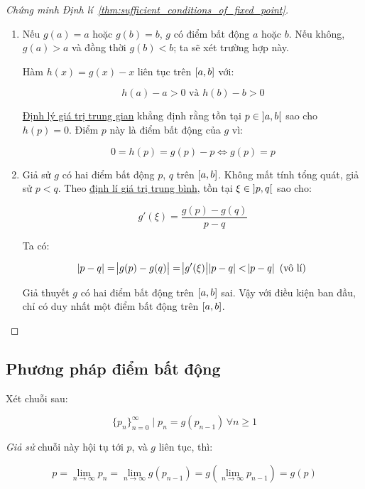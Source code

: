 \documentclass[../../Lectures]{subfiles}
\begin{document}
\begin{proof}[Chứng minh Định lí~\ref{thm:sufficient_conditions_of_fixed_point}]
\phantom\\
\begin{enumerate}
    \item Nếu \(g(a) = a\) hoặc \(g(b) = b\), \(g\) có điểm bất động \(a\) hoặc
        \(b\). Nếu không, \(g(a) > a\) và đồng thời \(g(b) < b\); ta sẽ xét
        trường hợp này.

        Hàm \(h(x) = g(x) - x\) liên tục trên \(\interval{a}{b}\) với:

        \[h(a) - a > 0 \text{ và } h(b) - b > 0\]

        \hyperref[thm:intermediate_value_theorem]{Định lý giá trị trung gian}
        khẳng định rằng tồn tại \(p \in \interval[open]{a}{b}\) sao cho \(h(p) =
        0\). Điểm \(p\) này là điểm bất động của \(g\) vì:

        \[0 = h(p) = g(p) - p \iff g(p) = p\]

    \item Giả sử \(g\) có hai điểm bất động \(p\), \(q\) trên
        \(\interval{a}{b}\). Không mất tính tổng quát, giả sử \(p < q\). Theo
        \hyperref[thm:mean_value_theorem]{định lí giá trị trung bình}, tồn tại
        \(\xi \in \interval[open]{p}{q}\) sao cho:

        \[g'(\xi) = \frac{g(p) - g(q)}{p - q}\]

        Ta có:

        \[\abs{p - q} = \abs{g(p) - g(q)} = \abs{g'(\xi)} \abs{p - q} < \abs{p - q} \text{ (vô lí)}\]

        Giả thuyết \(g\) có hai điểm bất động trên \(\interval{a}{b}\) sai. Vậy
        với điều kiện ban đầu, chỉ có duy nhất một điểm bất động trên
        \(\interval{a}{b}\).
\end{enumerate}
\end{proof}

\subsection{Phương pháp điểm bất động}

Xét chuỗi sau:

\[\{p_n\}_{n=0}^\infty \mid p_n = g(p_{n-1}) \, \forall n \geq 1\]

\emph{Giả sử} chuỗi này hội tụ tới \(p\), và \(g\) liên tục, thì:

\[p = \lim_{n \to \infty} p_n = \lim_{n \to \infty} g(p_{n - 1}) = g(\lim_{n \to \infty} p_{n - 1}) = g(p)\]
\end{document}
